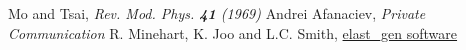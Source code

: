 \begin{thebibliography}{mybib}
             {Mo and Tsai},                              \textit{Rev. Mod. Phys. {\bf 41} (1969)}
     {Andrei Afanaciev},                          \textit{Private Communication}
          {R. Minehart, K. Joo and L.C. Smith},        \href{http://clasweb.jlab.org/cgi-bin/cvsweb/cvsweb.cgi/packages/aao/elast_gen}{elast\_gen software}
\end{thebibliography}
